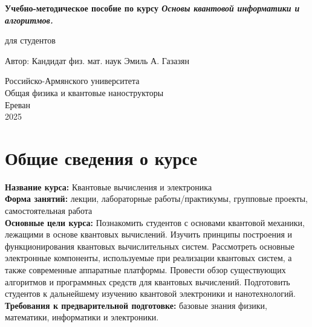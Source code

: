 \documentclass[a4paper,12pt]{article}
\begin{document}
\begin{titlepage}
	\centering
	\vspace*{1cm}

	{\Huge \textbf{Учебно-методическое пособие по курсу
			\textit{Основы квантовой информатики и алгоритмов.
			}}}

	\vspace{0.5cm}
	{\Large для студентов}

	\vspace{1.5cm}

	{\Large Автор: Кандидат физ. мат. наук Эмиль  А. Газазян}

	\vfill

	\vspace{0.8cm}

	{\Large Российско-Армянского университета \\
		Общая физика и квантовые нанострукторы\\
		Ереван\\
		2025}

\end{titlepage}

\tableofcontents
\newpage

\section{Общие сведения о курсе}
\textbf{Название курса:} Квантовые вычисления и электроника\\
\textbf{Форма занятий:} лекции, лабораторные работы/практикумы, групповые проекты, самостоятельная работа\\
\textbf{Основные цели курса:}
Познакомить студентов с основами квантовой механики, лежащими в основе квантовых вычислений.
Изучить принципы построения и функционирования квантовых вычислительных систем.
Рассмотреть основные электронные компоненты, используемые при реализации квантовых систем, а также современные аппаратные платформы.
Провести обзор существующих алгоритмов и программных средств для квантовых вычислений.
Подготовить студентов к дальнейшему изучению квантовой электроники и нанотехнологий.    \\
\textbf{Требования к предварительной подготовке:} базовые знания физики, математики, информатики и электроники.\\
\end{document}
